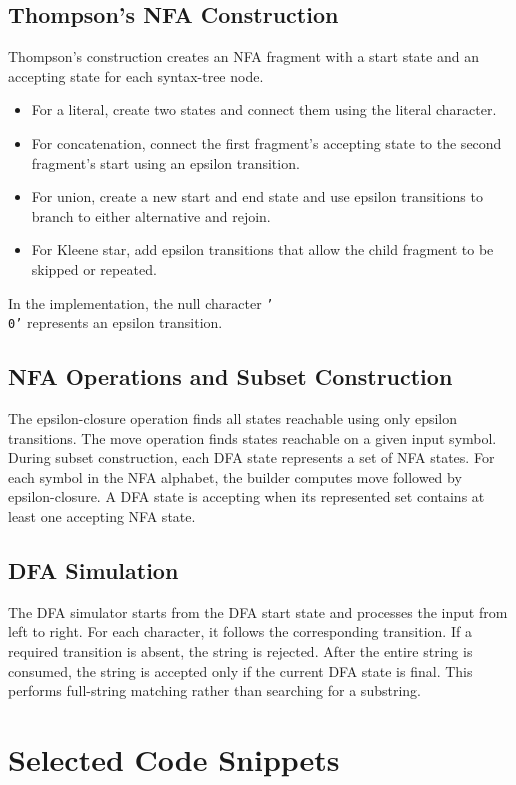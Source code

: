 \documentclass[12pt,a4paper]{report}
\begin{document}
\subsection{Thompson's NFA Construction}
Thompson's construction creates an NFA fragment with a start state and an accepting state for each syntax-tree node.
\begin{itemize}
    \item For a literal, create two states and connect them using the literal character.
    \item For concatenation, connect the first fragment's accepting state to the second fragment's start using an epsilon transition.
    \item For union, create a new start and end state and use epsilon transitions to branch to either alternative and rejoin.
    \item For Kleene star, add epsilon transitions that allow the child fragment to be skipped or repeated.
\end{itemize}
In the implementation, the null character \texttt{'\\0'} represents an epsilon transition.

\subsection{NFA Operations and Subset Construction}
The epsilon-closure operation finds all states reachable using only epsilon transitions. The move operation finds states reachable on a given input symbol. During subset construction, each DFA state represents a set of NFA states. For each symbol in the NFA alphabet, the builder computes move followed by epsilon-closure. A DFA state is accepting when its represented set contains at least one accepting NFA state.

\subsection{DFA Simulation}
The DFA simulator starts from the DFA start state and processes the input from left to right. For each character, it follows the corresponding transition. If a required transition is absent, the string is rejected. After the entire string is consumed, the string is accepted only if the current DFA state is final. This performs full-string matching rather than searching for a substring.

\section{Selected Code Snippets}
\end{document}
